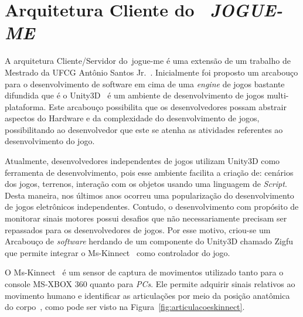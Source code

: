 \section{Arquitetura Cliente do ~\textit{JOGUE-ME}}\label{sec:cliente_game}
A arquitetura Cliente/Servidor do~\ac{jogue-me} é uma extensão de um trabalho de Mestrado da UFCG Antônio Santos Jr.~\cite{antonio2013}. Inicialmente foi proposto um arcabouço para o desenvolvimento de software em cima de uma \textit{engine} de jogos bastante difundida que é o Unity3D~\cite{unity3d} é um ambiente de desenvolvimento de jogos multi-plataforma. Este arcabouço possibilita que os desenvolvedores possam abstrair aspectos do Hardware e da complexidade do desenvolvimento de jogos, possibilitando ao desenvolvedor que este se atenha as atividades referentes ao desenvolvimento do jogo.

Atualmente, desenvolvedores independentes de jogos utilizam Unity3D como ferramenta de desenvolvimento, pois esse ambiente facilita a criação de: cenários dos jogos, terrenos, interação com os objetos usando uma linguagem de \textit{Script}. Desta maneira, nos últimos anos ocorreu uma popularização do desenvolvimento de jogos eletrônicos independentes.  Contudo, o desenvolvimento com propósito de monitorar sinais motores possui desafios que não necessariamente precisam ser repassados para os desenvolvedores de jogos. Por esse motivo, criou-se um Arcabouço de \textit{software} herdando de um componente do Unity3D chamado Zigfu~\cite{zigfu} que permite integrar o Ms-Kinnect~\cite{kinnect2013} como controlador do jogo. 


O Ms-Kinnect~\cite{kinnect2013} é um sensor de captura de movimentos utilizado tanto para o console MS-XBOX 360 quanto para \textit{PCs}. Ele permite adquirir sinais relativos ao movimento humano e identificar as articulações por meio da posição anatômica do corpo~\cite{hamill1999bases}, como pode ser visto na Figura~\ref{fig:articulacoeskinnect}.


